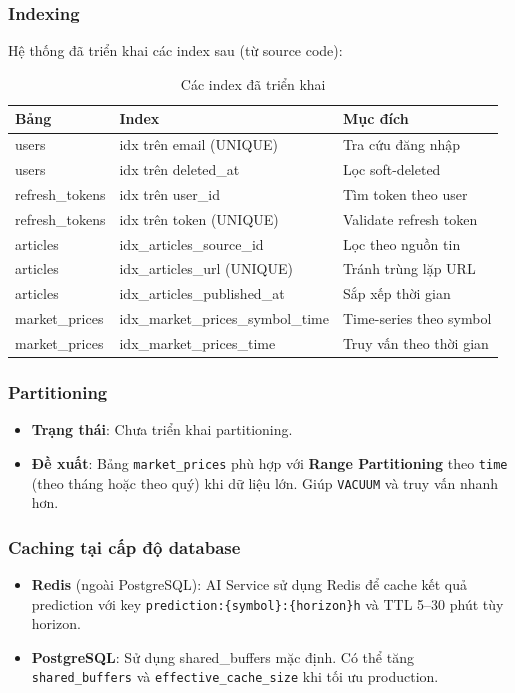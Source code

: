 \subsubsection{Indexing}

Hệ thống đã triển khai các index sau (từ source code):

\begin{table}[H]
\centering
\caption{Các index đã triển khai}
\begin{tabular}{|l|l|l|}
\hline
\textbf{Bảng} & \textbf{Index} & \textbf{Mục đích} \\
\hline
users & idx trên email (UNIQUE) & Tra cứu đăng nhập \\
users & idx trên deleted\_at & Lọc soft-deleted \\
refresh\_tokens & idx trên user\_id & Tìm token theo user \\
refresh\_tokens & idx trên token (UNIQUE) & Validate refresh token \\
articles & idx\_articles\_source\_id & Lọc theo nguồn tin \\
articles & idx\_articles\_url (UNIQUE) & Tránh trùng lặp URL \\
articles & idx\_articles\_published\_at & Sắp xếp thời gian \\
market\_prices & idx\_market\_prices\_symbol\_time & Time-series theo symbol \\
market\_prices & idx\_market\_prices\_time & Truy vấn theo thời gian \\
\hline
\end{tabular}
\end{table}

\subsubsection{Partitioning}

\begin{itemize}
    \item \textbf{Trạng thái}: Chưa triển khai partitioning.
    \item \textbf{Đề xuất}: Bảng \texttt{market\_prices} phù hợp với \textbf{Range Partitioning} theo \texttt{time} (theo tháng hoặc theo quý) khi dữ liệu lớn. Giúp \texttt{VACUUM} và truy vấn nhanh hơn.
\end{itemize}

\subsubsection{Caching tại cấp độ database}

\begin{itemize}
    \item \textbf{Redis} (ngoài PostgreSQL): AI Service sử dụng Redis để cache kết quả prediction với key \texttt{prediction:\{symbol\}:\{horizon\}h} và TTL 5--30 phút tùy horizon.
    \item \textbf{PostgreSQL}: Sử dụng shared\_buffers mặc định. Có thể tăng \texttt{shared\_buffers} và \texttt{effective\_cache\_size} khi tối ưu production.
\end{itemize}
